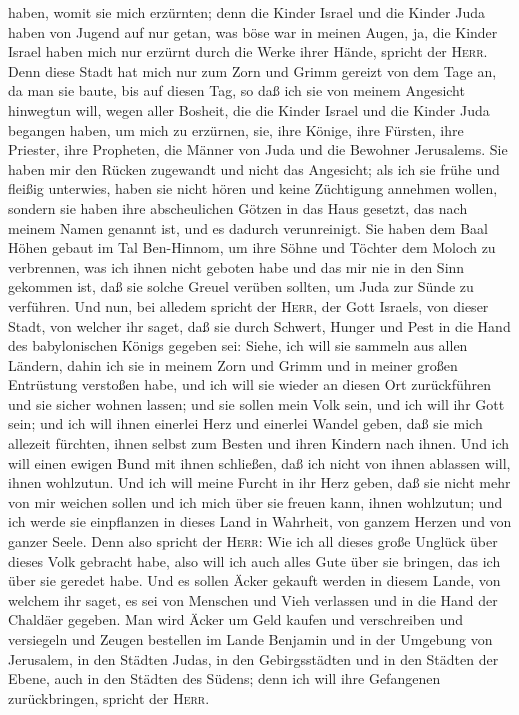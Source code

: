 haben, womit sie mich erzürnten;  denn die Kinder Israel
und die Kinder Juda haben von Jugend auf nur getan, was böse war in
meinen Augen, ja, die Kinder Israel haben mich nur erzürnt durch die
Werke ihrer Hände, spricht der \textsc{Herr}.  Denn diese
Stadt hat mich nur zum Zorn und Grimm gereizt von dem Tage an, da man
sie baute, bis auf diesen Tag, so daß ich sie von meinem Angesicht
hinwegtun will,  wegen aller Bosheit, die die Kinder
Israel und die Kinder Juda begangen haben, um mich zu erzürnen, sie,
ihre Könige, ihre Fürsten, ihre Priester, ihre Propheten, die Männer von
Juda und die Bewohner Jerusalems.  Sie haben mir den
Rücken zugewandt und nicht das Angesicht; als ich sie frühe und fleißig
unterwies, haben sie nicht hören und keine Züchtigung annehmen wollen,
 sondern sie haben ihre abscheulichen Götzen in das Haus
gesetzt, das nach meinem Namen genannt ist, und es dadurch verunreinigt.
 Sie haben dem Baal Höhen gebaut im Tal Ben-Hinnom, um
ihre Söhne und Töchter dem Moloch zu verbrennen, was ich ihnen nicht
geboten habe und das mir nie in den Sinn gekommen ist, daß sie solche
Greuel verüben sollten, um Juda zur Sünde zu verführen. 
Und nun, bei alledem spricht der \textsc{Herr}, der Gott Israels, von
dieser Stadt, von welcher ihr saget, daß sie durch Schwert, Hunger und
Pest in die Hand des babylonischen Königs gegeben sei: 
Siehe, ich will sie sammeln aus allen Ländern, dahin ich sie in meinem
Zorn und Grimm und in meiner großen Entrüstung verstoßen habe, und ich
will sie wieder an diesen Ort zurückführen und sie sicher wohnen lassen;
 und sie sollen mein Volk sein, und ich will ihr Gott
sein;  und ich will ihnen einerlei Herz und einerlei
Wandel geben, daß sie mich allezeit fürchten, ihnen selbst zum Besten
und ihren Kindern nach ihnen.  Und ich will einen ewigen
Bund mit ihnen schließen, daß ich nicht von ihnen ablassen will, ihnen
wohlzutun. Und ich will meine Furcht in ihr Herz geben, daß sie nicht
mehr von mir weichen sollen  und ich mich über sie freuen
kann, ihnen wohlzutun; und ich werde sie einpflanzen in dieses Land in
Wahrheit, von ganzem Herzen und von ganzer Seele.  Denn
also spricht der \textsc{Herr}: Wie ich all dieses große Unglück über
dieses Volk gebracht habe, also will ich auch alles Gute über sie
bringen, das ich über sie geredet habe.  Und es sollen
Äcker gekauft werden in diesem Lande, von welchem ihr saget, es sei von
Menschen und Vieh verlassen und in die Hand der Chaldäer gegeben.
 Man wird Äcker um Geld kaufen und verschreiben und
versiegeln und Zeugen bestellen im Lande Benjamin und in der Umgebung
von Jerusalem, in den Städten Judas, in den Gebirgsstädten und in den
Städten der Ebene, auch in den Städten des Südens; denn ich will ihre
Gefangenen zurückbringen, spricht der \textsc{Herr}.

